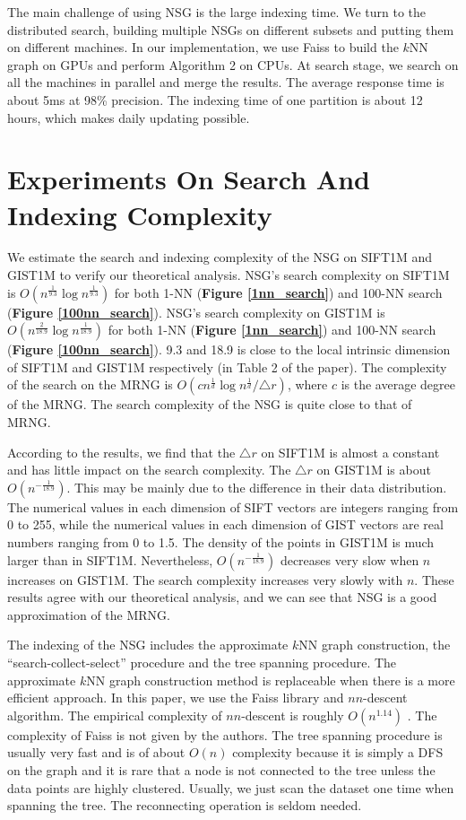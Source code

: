 \documentclass{vldb}
\begin{document}
\begin{appendix}
The main challenge of using NSG is the large indexing time. We turn to the distributed search, building multiple NSGs on different subsets and putting them on different machines. In our implementation, we use Faiss to build the $k$NN graph on GPUs and perform Algorithm 2 on CPUs. At search stage, we search on all the machines in parallel and merge the results. The average response time is about 5ms at 98\% precision. The indexing time of one partition is about 12 hours, which makes daily updating possible. 

\section{Experiments On Search And Indexing Complexity}
We estimate the search and indexing complexity of the NSG on SIFT1M and GIST1M to verify our theoretical analysis. NSG's search complexity on SIFT1M is $O(n^{\frac{1}{9.3}}\log n^{\frac{1}{9.3}})$ for both 1-NN (\textbf{Figure \ref{1nn_search}}) and 100-NN search (\textbf{Figure \ref{100nn_search}}). NSG's search complexity on GIST1M is $O(n^{\frac{2}{18.9}}\log n^{\frac{1}{18.9}})$ for both 1-NN (\textbf{Figure \ref{1nn_search}}) and 100-NN search (\textbf{Figure \ref{100nn_search}}). 9.3 and 18.9 is close to the local intrinsic dimension of SIFT1M and GIST1M respectively (in Table 2 of the paper). The complexity of the search on the MRNG is $O(cn^{\frac{1}{d}}\log n^{\frac{1}{d}}/\triangle{r})$, where $c$ is the average degree of the MRNG. The search complexity of the NSG is quite close to that of MRNG.  

According to the results, we find that the $\triangle{r}$ on SIFT1M is almost a constant and has little impact on the search complexity. The $\triangle{r}$ on GIST1M is about $O(n^{-\frac{1}{18.9}})$. This may be mainly due to the difference in their data distribution. The numerical values in each dimension of SIFT vectors are integers ranging from 0 to 255, while the numerical values in each dimension of GIST vectors are real numbers ranging from 0 to 1.5. The density of the points in GIST1M is much larger than in SIFT1M. Nevertheless, $O(n^{-\frac{1}{18.9}})$ decreases very slow when $n$ increases on GIST1M. The search complexity increases very slowly with $n$. These results agree with our theoretical analysis, and we can see that NSG is a good approximation of the MRNG. 


The indexing of the NSG includes the approximate $k$NN graph construction, the ``search-collect-select'' procedure and the tree spanning procedure. The approximate $k$NN graph construction method is replaceable when there is a more efficient approach. In this paper, we use the Faiss library and $nn$-descent algorithm. The empirical complexity of $nn$-descent is roughly $O(n^{1.14})$ \cite{Dong2011Efficient}. The complexity of Faiss is not given by the authors. The tree spanning procedure is usually very fast and is of about $O(n)$ complexity because it is simply a DFS on the graph and it is rare that a node is not connected to the tree unless the data points are highly clustered. Usually, we just scan the dataset one time when spanning the tree. The reconnecting operation is seldom needed. 


\end{appendix}
\end{document}
